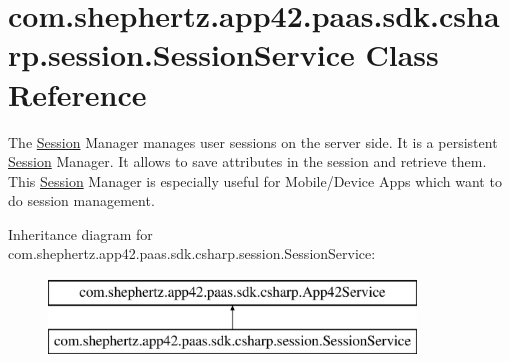 \hypertarget{classcom_1_1shephertz_1_1app42_1_1paas_1_1sdk_1_1csharp_1_1session_1_1_session_service}{\section{com.\+shephertz.\+app42.\+paas.\+sdk.\+csharp.\+session.\+Session\+Service Class Reference}
\label{classcom_1_1shephertz_1_1app42_1_1paas_1_1sdk_1_1csharp_1_1session_1_1_session_service}
}


The \hyperlink{classcom_1_1shephertz_1_1app42_1_1paas_1_1sdk_1_1csharp_1_1session_1_1_session}{Session} Manager manages user sessions on the server side. It is a persistent \hyperlink{classcom_1_1shephertz_1_1app42_1_1paas_1_1sdk_1_1csharp_1_1session_1_1_session}{Session} Manager. It allows to save attributes in the session and retrieve them. This \hyperlink{classcom_1_1shephertz_1_1app42_1_1paas_1_1sdk_1_1csharp_1_1session_1_1_session}{Session} Manager is especially useful for Mobile/\+Device Apps which want to do session management.  


Inheritance diagram for com.\+shephertz.\+app42.\+paas.\+sdk.\+csharp.\+session.\+Session\+Service\+:\begin{figure}[H]
\begin{center}
\leavevmode
\includegraphics[height=2.000000cm]{classcom_1_1shephertz_1_1app42_1_1paas_1_1sdk_1_1csharp_1_1session_1_1_session_service}
\end{center}
\end{figure}
